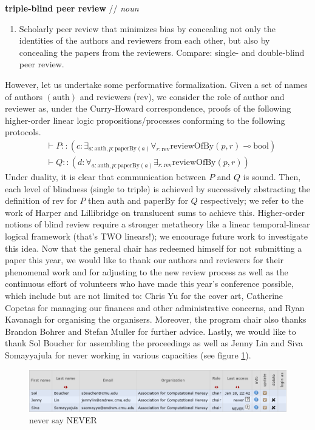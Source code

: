 \documentclass[12pt]{article}
\newcommand{\auth}{\text{auth}}
\newcommand{\paperby}{\text{paperBy}}
\newcommand{\reviewofby}{\text{reviewOfBy}}
\newcommand{\bool}{\text{bool}}
\newcommand{\rev}{\text{rev}}
\begin{document}
\textbf{triple-blind peer review} // \emph{noun}
\begin{enumerate}
\item Scholarly peer review that minimizes bias by concealing not only the identities of the authors and reviewers from each other, but also by concealing the papers from the reviewers. Compare: single- and double-blind peer review.
\end{enumerate}
However, let us undertake some performative formalization. Given a set of names of authors $(\auth)$ and reviewers ($\rev$), we consider the role of author and reviewer as, under the Curry-Howard correspondence, proofs of the following higher-order linear logic propositions/processes conforming to the following protocols.
\begin{align*}
&\vdash P::(c:\exists_{a:\auth,p:\paperby(a)}\forall_{r:\rev}\reviewofby(p, r)\multimap\bool)\\
&\vdash Q::(d:\forall_{a:\auth,p:\paperby(a)}\exists_{r:\rev}\reviewofby(p, r))
\end{align*}
Under duality, it is clear that communication between $P$ and $Q$ is sound. Then, each level of blindness (single to triple) is achieved by successively abstracting the definition of $\rev$ for $P$ then $\auth$ and $\paperby$ for $Q$ respectively; we refer to the work of Harper and Lillibridge \cite{harper+:sharing} on translucent sums to achieve this. Higher-order notions of blind review require a stronger metatheory like a linear temporal-linear logical framework (that’s TWO linears!); we encourage future work to investigate this idea.
Now that the general chair has redeemed himself for not submitting a paper this year, we would like to thank our authors and reviewers for their phenomenal work and for adjusting to the new review process as well as the continuous effort of volunteers who have made this year’s conference possible, which include but are not limited to: Chris Yu for the cover art, Catherine Copetas for managing our finances and other administrative concerns, and Ryan Kavanagh for organising the organisers. Moreover, the program chair also thanks Brandon Bohrer and Stefan Muller for further advice. Lastly, we would like to thank Sol Boucher for assembling the proceedings as well as Jenny Lin and Siva Somayyajula for never working in various capacities (see figure \ref{fig:never}).
\begin{figure}
\centering
\includegraphics[width=\textwidth]{never.png}
\caption{never say NEVER}
\label{fig:never}
\end{figure}
\end{document}
